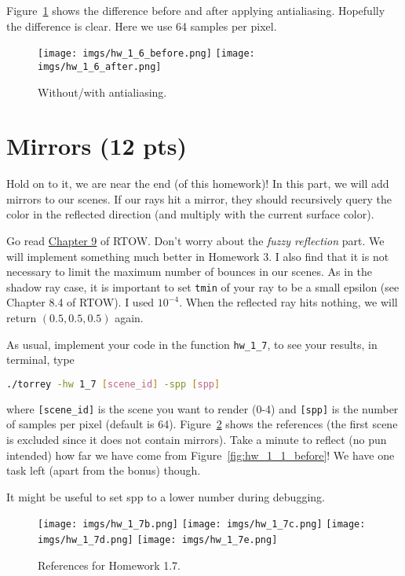 Figure~\ref{fig:hw_1_6} shows the difference before and after applying antialiasing. Hopefully the difference is clear. Here we use 64 samples per pixel.

\begin{figure}[ht]
    \centering
    \texttt{[image: imgs/hw\_1\_6\_before.png]}
    \texttt{[image: imgs/hw\_1\_6\_after.png]}
    \caption{Without/with antialiasing.}
    \label{fig:hw_1_6}
\end{figure}

\section{Mirrors (12 pts)}
Hold on to it, we are near the end (of this homework)! In this part, we will add mirrors to our scenes. If our rays hit a mirror, they should recursively query the color in the reflected direction (and multiply with the current surface color).

Go read \href{https://raytracing.github.io/books/RayTracingInOneWeekend.html#metal}{Chapter 9} of RTOW. Don't worry about the \emph{fuzzy reflection} part. We will implement something much better in Homework 3. I also find that it is not necessary to limit the maximum number of bounces in our scenes. As in the shadow ray case, it is important to set \lstinline{tmin} of your ray to be a small epsilon (see Chapter 8.4 of RTOW). I used $10^{-4}$. When the reflected ray hits nothing, we will return $(0.5, 0.5, 0.5)$ again.

As usual, implement your code in the function \lstinline{hw_1_7}, to see your results, in terminal, type
\begin{lstlisting}[language=bash]
  ./torrey -hw 1_7 [scene_id] -spp [spp]
\end{lstlisting}
where \lstinline{[scene_id]} is the scene you want to render (0-4) and \lstinline{[spp]} is the number of samples per pixel (default is 64). Figure~\ref{fig:hw_1_7} shows the references (the first scene is excluded since it does not contain mirrors). Take a minute to reflect (no pun intended) how far we have come from Figure~\ref{fig:hw_1_1_before}! We have one task left (apart from the bonus) though.

It might be useful to set spp to a lower number during debugging.

\begin{figure}[ht]
    \centering
    \texttt{[image: imgs/hw\_1\_7b.png]}
    \texttt{[image: imgs/hw\_1\_7c.png]}
    \texttt{[image: imgs/hw\_1\_7d.png]}
    \texttt{[image: imgs/hw\_1\_7e.png]}
    \caption{References for Homework 1.7.}
    \label{fig:hw_1_7}
\end{figure}

